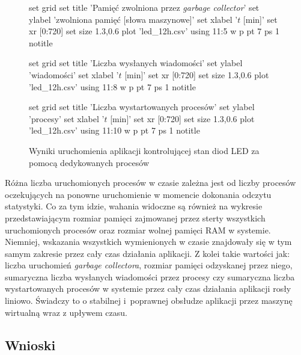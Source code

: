 \begin{figure}
\begin{gnuplot}[terminal=epslatex,terminaloptions=color]
	set grid
	set title 'Pamięć zwolniona przez \emph{garbage collector}'
	set ylabel 'zwolniona pamięć [słowa maszynowe]'
	set xlabel '$t$ [min]'
	set xr [0:720]
	set size 1.3,0.6
	plot 'led_12h.csv' using 11:5 w p pt 7 ps 1 notitle
\end{gnuplot}

\begin{gnuplot}[terminal=epslatex,terminaloptions=color]
	set grid
	set title 'Liczba wysłanych wiadomości'
	set ylabel 'wiadomości'
	set xlabel '$t$ [min]'
	set xr [0:720]
	set size 1.3,0.6
	plot 'led_12h.csv' using 11:8 w p pt 7 ps 1 notitle
\end{gnuplot}

\begin{gnuplot}[terminal=epslatex,terminaloptions=color]
	set grid
	set title 'Liczba wystartowanych procesów'
	set ylabel 'procesy'
	set xlabel '$t$ [min]'
	set xr [0:720]
	set size 1.3,0.6
	plot 'led_12h.csv' using 11:10 w p pt 7 ps 1 notitle
\end{gnuplot}

\caption{Wyniki uruchomienia aplikacji kontrolującej stan diod LED za pomocą dedykowanych procesów}
\label{fig:ledGraphs}

\end{figure}

Różna liczba uruchomionych procesów w czasie zależna jest od liczby procesów oczekujących na ponowne uruchomienie w momencie dokonania odczytu statystyki.
Co za tym idzie, wahania widoczne są również na wykresie przedstawiającym rozmiar pamięci zajmowanej przez sterty wszystkich uruchomionych procesów oraz rozmiar wolnej pamięci RAM w systemie.
Niemniej, wskazania wszystkich wymienionych w czasie znajdowały się w tym samym zakresie przez cały czas działania aplikacji.
Z kolei takie wartości jak: liczba uruchomień \emph{garbage collectora}, rozmiar pamięci odzyskanej przez niego, sumaryczna liczba wysłanych wiadomości przez procesy czy sumaryczna liczba wystartowanych procesów w systemie przez cały czas działania aplikacji rosły liniowo.
Świadczy to o stabilnej i~poprawnej obsłudze aplikacji przez maszynę wirtualną wraz z upływem czasu.

\subsection{Wnioski}

